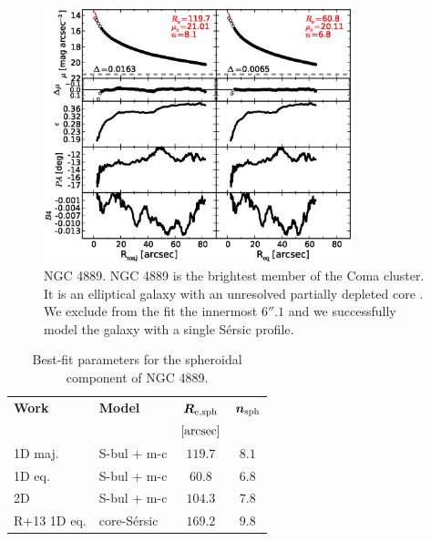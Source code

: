 \documentclass[preprint2]{emulateapj}
\newcommand{\fitfigurewidth}{0.8\textwidth}
\begin{document}
  \begin{figure}[h]
  \begin{center}
  \includegraphics[width=\fitfigurewidth]{images/n4889_1Dfit.eps}
  \caption{NGC 4889.
  NGC 4889 is the brightest member of the Coma cluster. 
  It is an elliptical galaxy with an unresolved partially depleted core \citep{rusli2013}. %
  We exclude from the fit the innermost $6''.1$ and
  we successfully model the galaxy with a single S\'ersic profile.
  }
  \end{center}
  \end{figure}

  \begin{table}[h]
  \small
  \caption{Best-fit parameters for the spheroidal component of NGC 4889.}
  \begin{center}
  \begin{tabular}{llcc}
  \hline
  {\bf Work} & {\bf Model}   & $\bm R_{\rm e,sph}$    & $\bm n_{\rm sph}$ \\
    &  &  $[\rm arcsec]$ & \\
  \hline
  1D maj. & S-bul + m-c & $119.7$  &  $8.1$ \\
  1D eq.  & S-bul + m-c & $60.8$	&  $6.8$ \\
  2D      & S-bul + m-c & $104.3$  &  $7.8$ \\
  \hline
  R+13 1D eq.         & core-S\'ersic & $169.2$  &  $9.8$ \\
  \hline
  \end{tabular}
  \end{center}
  \label{tab:n4889}
  \end{table}
    
\end{document}
